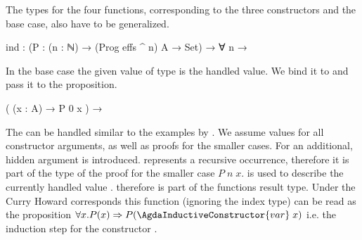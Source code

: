 The types for the four functions, corresponding to the three constructors and
the base case, also have to be generalized.

\begin{code}
ind : (P : (n : ℕ) → (Prog effs ^ n) A → Set) → ∀ n →
\end{code}
In the base case the given value of type  is the handled value.
We bind it to  and pass it to the proposition.
\begin{code}
  (                (x : A)                                        → P 0 x                     )  →
\end{code}
The  can be handled similar to the examples by
\textcite{DBLP:journals/corr/abs-1806-05230}.
We assume values for all constructor arguments, as well as proofs for the
smaller cases.
For  an additional, hidden argument
 is introduced.
 represents a recursive occurrence, therefore it is part of the
type of the proof for the smaller case $P\;n\;x$.
 is used to describe the currently handled value
\AgdaSpace{}.
\AgdaSpace{} therefore is part of
the functions result type.
Under the Curry Howard corresponds this function (ignoring the index type) can
be read as the proposition
$\forall x. P(x) \Rightarrow P(\AgdaInductiveConstructor{var}\;x)$
i.e. the induction step for the constructor .
